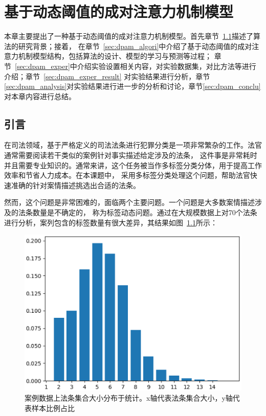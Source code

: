 
\chapter{基于动态阈值的成对注意力机制模型}
\label{chapter:3}
本章主要提出了一种基于动态阈值的成对注意力机制模型。首先章节~\ref{sec:dpam_intro}描述了算法的研究背景；接着，
在章节~\ref{sec:dpam_algori}中介绍了基于动态阈值的成对注意力机制模型结构，包括算法的设计、模型的学习与预测等过程；
章节~\ref{sec:dpam_exper}中介绍实验设置相关内容，对实验数据集，对比方法等进行介绍；章节~\ref{sec:dpam_exper_result}
对实验结果进行分析，章节\ref{sec:dpam_analysis}对实验结果进行进一步的分析和讨论，章节\ref{sec:dpam_conclu}对本章内容进行总结。

\section{引言}
\label{sec:dpam_intro}

在司法领域，基于严格定义的司法法条进行犯罪分类是一项非常繁杂的工作。法官通常需要阅读若干类似的案例针对事实描述给定涉及的法条，
这件事是非常耗时并且需要专业知识的。通常来讲，这个任务被当作多标签分类分体，用于提高工作效率和节省人力成本。在本课题中，
采用多标签分类处理这个问题，帮助法官快速准确的针对案情描述挑选出合适的法条。

然而，这个问题是非常困难的，面临两个主要问题。一个问题是大多数案情描述涉及的法条数量是不确定的，
称为标签动态问题。通过在大规模数据上对70个法条进行分析，案列包含的标签数量有很大差异，其结果如图~\ref{fig:dis1}所示：
\begin{figure}[htbp]
\centering
\includegraphics[scale=0.5,viewport=0 0 450 350,clip=true]{./sources/1.eps}
\caption{\label{fig:dis1}案例数据上法条集合大小分布于统计。x轴代表法条集合大小，y轴代表样本比例占比}
\end{figure}


